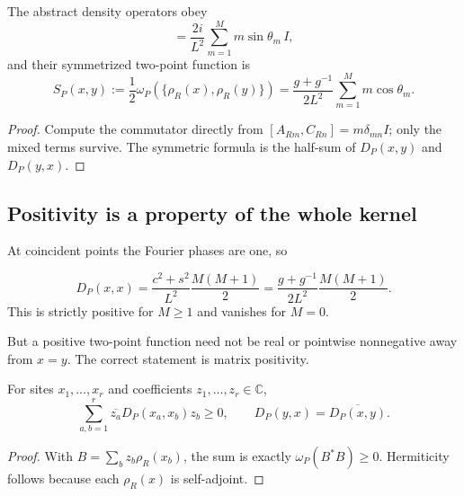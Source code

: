 \begin{proposition}
\label{prop:ch19-spatial-commutator}
\label{prop:ch19-spatial-symmetrized}
The abstract density operators obey
\begin{equation}
 [\rho_R(x),\rho_R(y)]
  =\frac{2i}{L^2}\sum_{m=1}^{M}m\sin\theta_m\,I,
 \label{eq:ch19-spatial-commutator}
\end{equation}
and their symmetrized two-point function is
\begin{equation}
 S_P(x,y):=\frac12\omega_P(\{\rho_R(x),\rho_R(y)\})
   =\frac{g+g^{-1}}{2L^2}
       \sum_{m=1}^{M}m\cos\theta_m.
 \label{eq:ch19-spatial-symmetrized}
\end{equation}
\end{proposition}
\begin{proof}
Compute the commutator directly from
$[A_{Rm},C_{Rn}]=m\delta_{mn}I$; only the mixed terms survive.
The symmetric formula is the half-sum of $D_P(x,y)$ and
$D_P(y,x)$.
\end{proof}

\subsection*{Positivity is a property of the whole kernel}

At coincident points the Fourier phases are one, so
\begin{theorem}
\label{thm:ch19-spatial-diagonal}
\begin{equation}
 D_P(x,x)
 =\frac{c^2+s^2}{L^2}\frac{M(M+1)}2
 =\frac{g+g^{-1}}{2L^2}\frac{M(M+1)}2.
 \label{eq:ch19-spatial-diagonal}
\end{equation}
This is strictly positive for $M\geq1$ and vanishes for $M=0$.
\end{theorem}

But a positive two-point function need not be real or pointwise
nonnegative away from $x=y$.  The correct statement is matrix
positivity.
\begin{proposition}
\label{prop:ch19-spatial-psd}
For sites $x_1,\ldots,x_r$ and coefficients $z_1,\ldots,z_r\in\mathbb C$,
\begin{equation}
 \sum_{a,b=1}^{r}\overline{z_a}D_P(x_a,x_b)z_b\geq0,
 \qquad D_P(y,x)=\overline{D_P(x,y)}.
 \label{eq:ch19-spatial-psd}
\end{equation}
\end{proposition}
\begin{proof}
With $B=\sum_b z_b\rho_R(x_b)$, the sum is exactly
$\omega_P(B^*B)\geq0$.  Hermiticity follows because each
$\rho_R(x)$ is self-adjoint.
\end{proof}

